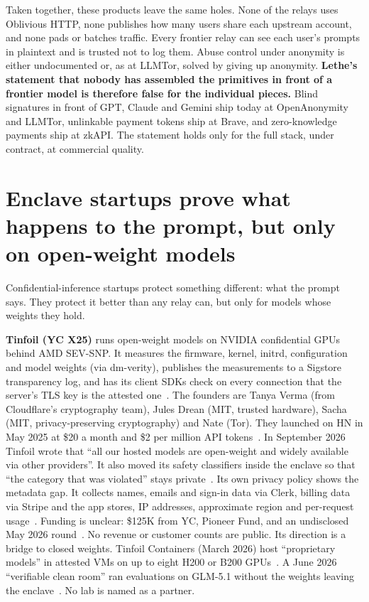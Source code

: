 \documentclass[10pt,a4paper]{article}
\begin{document}
Taken together, these products leave the same holes. None of the relays uses Oblivious HTTP, none publishes how many users share each upstream account, and none pads or batches traffic. Every frontier relay can see each user's prompts in plaintext and is trusted not to log them. Abuse control under anonymity is either undocumented or, as at LLMTor, solved by giving up anonymity. \textbf{Lethe's statement that nobody has assembled the primitives in front of a frontier model is therefore false for the individual pieces.} Blind signatures in front of GPT, Claude and Gemini ship today at OpenAnonymity and LLMTor, unlinkable payment tokens ship at Brave, and zero-knowledge payments ship at zkAPI. The statement holds only for the full stack, under contract, at commercial quality.

\section{Enclave startups prove what happens to the prompt, but only on open-weight models}

Confidential-inference startups protect something different: what the prompt says. They protect it better than any relay can, but only for models whose weights they hold.

\textbf{Tinfoil (YC X25)} runs open-weight models on NVIDIA confidential GPUs behind AMD SEV-SNP. It measures the firmware, kernel, initrd, configuration and model weights (via dm-verity), publishes the measurements to a Sigstore transparency log, and has its client SDKs check on every connection that the server's TLS key is the attested one~\cite{tinfoil-docs-attestation-a}. The founders are Tanya Verma (from Cloudflare's cryptography team), Jules Drean (MIT, trusted hardware), Sacha (MIT, privacy-preserving cryptography) and Nate (Tor). They launched on HN in May 2025 at \$20 a month and \$2 per million API tokens~\cite{launch-hn-tinfoil}. In September 2026 Tinfoil wrote that ``all our hosted models are open-weight and widely available via other providers''. It also moved its safety classifiers inside the enclave so that ``the category that was violated'' stays private~\cite{tinfoil-blog-safety-withou}. Its own privacy policy shows the metadata gap. It collects names, emails and sign-in data via Clerk, billing data via Stripe and the app stores, IP addresses, approximate region and per-request usage~\cite{tinfoil-privacy-policy}. Funding is unclear: \$125K from YC, Pioneer Fund, and an undisclosed May 2026 round~\cite{pitchbook-tinfoil}. No revenue or customer counts are public. Its direction is a bridge to closed weights. Tinfoil Containers (March 2026) host ``proprietary models'' in attested VMs on up to eight H200 or B200 GPUs~\cite{tinfoil-blog-tinfoil-conta}. A June 2026 ``verifiable clean room'' ran evaluations on GLM-5.1 without the weights leaving the enclave~\cite{tinfoil-blog-verifiable-cl}. No lab is named as a partner.
\end{document}
